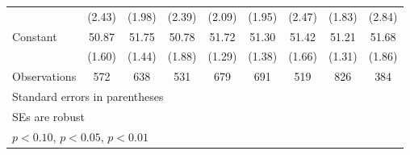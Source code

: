 \begin{table}[htbp]
\begin{tabular}{l*{8}{c}}
                &   (2.43)         &   (1.98)         &   (2.39)         &   (2.09)         &   (1.95)         &   (2.47)         &   (1.83)         &   (2.84)         \\
Constant        &    50.87\sym{***}&    51.75\sym{***}&    50.78\sym{***}&    51.72\sym{***}&    51.30\sym{***}&    51.42\sym{***}&    51.21\sym{***}&    51.68\sym{***}\\
                &   (1.60)         &   (1.44)         &   (1.88)         &   (1.29)         &   (1.38)         &   (1.66)         &   (1.31)         &   (1.86)         \\
\hline
Observations    &      572         &      638         &      531         &      679         &      691         &      519         &      826         &      384         \\
\hline\hline
\multicolumn{9}{l}{\footnotesize Standard errors in parentheses}\\
\multicolumn{9}{l}{\footnotesize SEs are robust}\\
\multicolumn{9}{l}{\footnotesize \sym{*} \(p<0.10\), \sym{**} \(p<0.05\), \sym{***} \(p<0.01\)}\\
\end{tabular}
\end{table}
